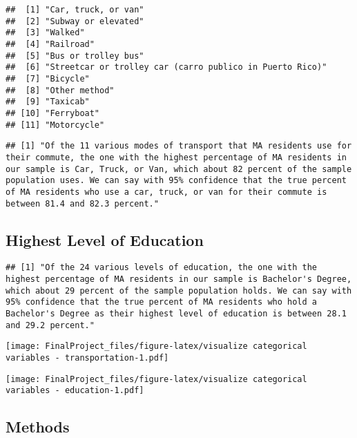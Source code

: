 \documentclass[
]{article}
\begin{document}
\begin{verbatim}
##  [1] "Car, truck, or van"                                     
##  [2] "Subway or elevated"                                     
##  [3] "Walked"                                                 
##  [4] "Railroad"                                               
##  [5] "Bus or trolley bus"                                     
##  [6] "Streetcar or trolley car (carro publico in Puerto Rico)"
##  [7] "Bicycle"                                                
##  [8] "Other method"                                           
##  [9] "Taxicab"                                                
## [10] "Ferryboat"                                              
## [11] "Motorcycle"
\end{verbatim}

\begin{verbatim}
## [1] "Of the 11 various modes of transport that MA residents use for their commute, the one with the highest percentage of MA residents in our sample is Car, Truck, or Van, which about 82 percent of the sample population uses. We can say with 95% confidence that the true percent of MA residents who use a car, truck, or van for their commute is between 81.4 and 82.3 percent."
\end{verbatim}

\hypertarget{highest-level-of-education}{%
\subsection{Highest Level of
Education}\label{highest-level-of-education}}

\begin{verbatim}
## [1] "Of the 24 various levels of education, the one with the highest percentage of MA residents in our sample is Bachelor's Degree, which about 29 percent of the sample population holds. We can say with 95% confidence that the true percent of MA residents who hold a Bachelor's Degree as their highest level of education is between 28.1 and 29.2 percent."
\end{verbatim}

\texttt{[image: FinalProject\_files/figure-latex/visualize categorical variables - transportation-1.pdf]}

\texttt{[image: FinalProject\_files/figure-latex/visualize categorical variables - education-1.pdf]}

\hypertarget{methods}{%
\subsection{Methods}\label{methods}}
\end{document}
